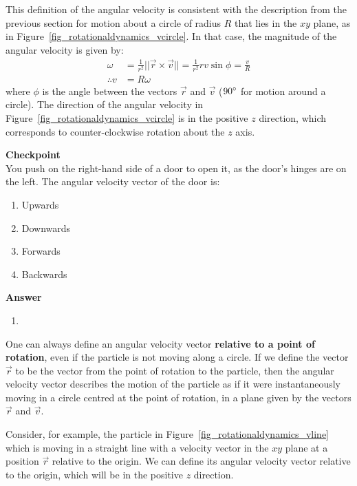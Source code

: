 This definition of the angular velocity is consistent with the description from the previous section for motion about a circle of radius $R$ that lies in the $xy$ plane, as in Figure~\ref{fig_rotationaldynamics_vcircle}. In that case, the magnitude of the angular velocity is given by:
\begin{align*}
\omega &=\frac{1}{r^2} || \vec r \times \vec v||= \frac{1}{r^2}r v\sin\phi= \frac{v}{R}\\
\therefore v &= R\omega
\end{align*}
where $\phi$ is the angle between the vectors $\vec r$ and $\vec v$ ($90{\degree}$ for motion around a circle). The direction of the angular velocity in Figure~\ref{fig_rotationaldynamics_vcircle} is in the positive $z$ direction, which corresponds to counter-clockwise rotation about the $z$ axis.

\begin{framed}
\textbf{Checkpoint}\\
You push on the right-hand side of a door to open it, as the door's hinges are on the left. The angular velocity vector of the door is:

\begin{enumerate}
\item Upwards
\item Downwards
\item Forwards
\item Backwards
\end{enumerate}

\begin{framed}
\textbf{Answer}\\
\begin{enumerate}
\item
\end{enumerate}
\end{framed}
\end{framed}

One can always define an angular velocity vector \textbf{relative to a point of rotation}, even if the particle is not moving along a circle. If we define the vector $\vec r$ to be the vector from the point of rotation to the particle, then the angular velocity vector describes the motion of the particle as if it were instantaneously moving in a circle centred at the point of rotation, in a plane given by the vectors $\vec r$ and $\vec v$.

Consider, for example, the particle in Figure~\ref{fig_rotationaldynamics_vline} which is moving in a straight line with a velocity vector in the $xy$ plane at a position $\vec r$ relative to the origin. We can define its angular velocity vector relative to the origin, which will be in the positive $z$ direction.

